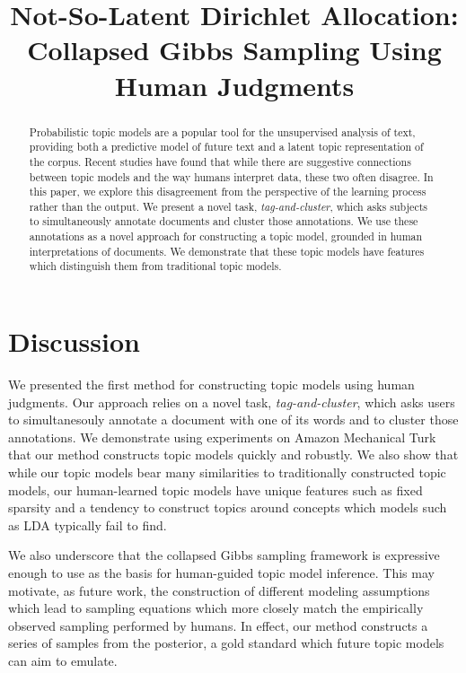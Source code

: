 \documentclass[11pt,letterpaper]{article}
\title{Not-So-Latent Dirichlet Allocation: \\ 
       Collapsed Gibbs Sampling Using Human Judgments}
\author{}
\begin{document}
\maketitle
\vspace{-.1in}
\begin{abstract}%
  Probabilistic topic models are a popular tool for the unsupervised
  analysis of text, providing both a predictive model of future text
  and a latent topic representation of the corpus.  Recent studies
  have found that while there are suggestive connections between topic
  models and the way humans interpret data, these two often disagree.
  In this paper, we explore this disagreement from the perspective of
  the learning process rather than the output.  We present a novel
  task, \emph{tag-and-cluster}, which asks subjects to simultaneously
  annotate documents and cluster those annotations.  We use these
  annotations as a novel approach for constructing a topic model,
  grounded in human interpretations of documents.  We demonstrate that
  these topic models have features which distinguish them from
  traditional topic models.
\end{abstract}





\section{Discussion}
  We presented the first method for constructing topic models using
  human judgments.  Our approach relies on a novel task,
  \emph{tag-and-cluster}, which asks users to simultanesouly annotate
  a document with one of its words and to cluster those annotations.
  We demonstrate using experiments on Amazon Mechanical Turk that our
  method constructs topic models quickly and robustly.  We also show
  that while our topic models bear many similarities to traditionally
  constructed topic models, our human-learned topic models have unique
  features such as fixed sparsity and a tendency to construct topics
  around concepts which models such as LDA typically fail to find.

  We also underscore that the collapsed Gibbs sampling framework is
  expressive enough to use as the basis for human-guided topic model
  inference.  This may motivate, as future work, the construction of
  different modeling assumptions which lead to sampling equations
  which more closely match the empirically observed sampling performed
  by humans.  In effect, our method constructs a series of samples
  from the posterior, a gold standard which future topic models can
  aim to emulate.


\small


\end{document}
